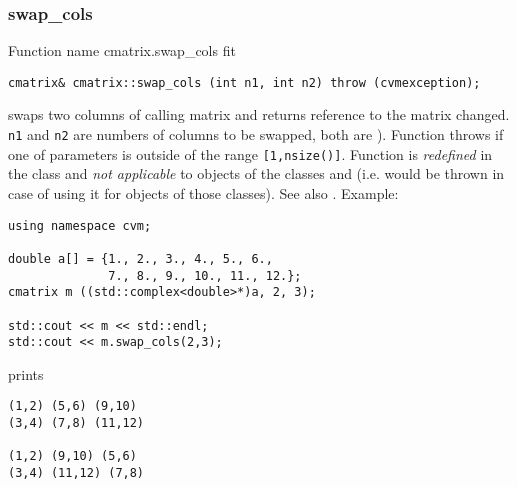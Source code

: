 \subsubsection{swap\_cols}
Function%
\pdfdest name {cmatrix.swap_cols} fit
\begin{verbatim}
cmatrix& cmatrix::swap_cols (int n1, int n2) throw (cvmexception);
\end{verbatim}
swaps two columns of  calling matrix and returns  reference to
the matrix changed. \verb"n1" and \verb"n2" are
numbers of columns to be swapped, 
both are \Based).
Function throws  
if one of  parameters is outside of the range
\verb"[1,nsize()]".
Function is \emph{redefined} in the class
 and
\emph{not applicable} to objects of the classes
 and
 (i.e. 
 would be thrown
in case of using it for objects of those classes).
See also .
Example:
\begin{Verbatim}
using namespace cvm;

double a[] = {1., 2., 3., 4., 5., 6.,
              7., 8., 9., 10., 11., 12.};
cmatrix m ((std::complex<double>*)a, 2, 3);

std::cout << m << std::endl;
std::cout << m.swap_cols(2,3);
\end{Verbatim}
prints
\begin{Verbatim}
(1,2) (5,6) (9,10)
(3,4) (7,8) (11,12)

(1,2) (9,10) (5,6)
(3,4) (11,12) (7,8)
\end{Verbatim}
\newpage




